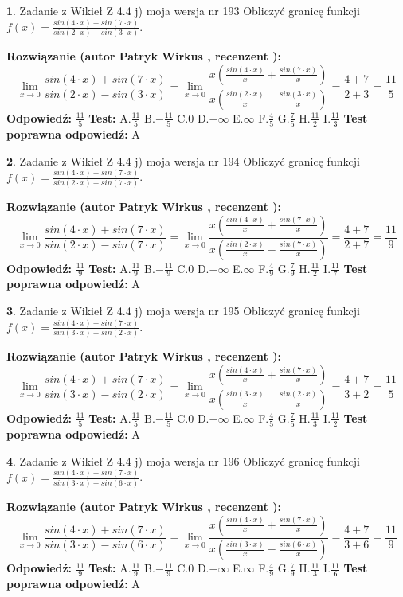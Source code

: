\documentclass[12pt, a4paper]{article}
\theoremstyle{definition} %
\newtheorem{zad}{}
\newcommand{\zadStart}[1]{\begin{zad}#1\newline}
\newcommand{\zadStop}{\end{zad}}
\newcommand{\rozwStart}[2]{\noindent \textbf{Rozwiązanie (autor #1 , recenzent #2): }\newline}
\newcommand{\rozwStop}{\newline}
\newcommand{\odpStart}{\noindent \textbf{Odpowiedź:}\newline}
\newcommand{\odpStop}{\newline}
\newcommand{\testStart}{\noindent \textbf{Test:}\newline}
\newcommand{\testStop}{\newline}
\newcommand{\kluczStart}{\noindent \textbf{Test poprawna odpowiedź:}\newline}
\newcommand{\kluczStop}{\newline}
\begin{document}
\zadStart{Zadanie z Wikieł Z 4.4 j) moja wersja nr 193}
Obliczyć granicę funkcji $f(x)=\frac{sin(4\cdot x) +sin(7\cdot x)}{sin(2\cdot x) -sin(3\cdot x)}$.
\zadStop
\rozwStart{Patryk Wirkus}{}
$$\lim\limits_{x\to 0}\frac{sin(4\cdot x) +sin(7\cdot x)}{sin(2\cdot x) -sin(3\cdot x)}=\lim\limits_{x\to 0}\frac{x(\frac{sin(4\cdot x)}{x}+\frac{sin(7\cdot x)}{x})}{x(\frac{sin(2\cdot x)}{x}-\frac{sin(3\cdot x)}{x})}=\frac{4+7}{2+3} = \frac{11}{5}$$
\rozwStop
\odpStart
$\frac{11}{5}$
\odpStop
\testStart
A.$\frac{11}{5}$
B.$-\frac{11}{5}$
C.$0$
D.$-\infty$
E.$\infty$
F.$\frac{4}{5}$
G.$\frac{7}{5}$
H.$\frac{11}{2}$
I.$\frac{11}{3}$
\testStop
\kluczStart
A
\kluczStop



\zadStart{Zadanie z Wikieł Z 4.4 j) moja wersja nr 194}
Obliczyć granicę funkcji $f(x)=\frac{sin(4\cdot x) +sin(7\cdot x)}{sin(2\cdot x) -sin(7\cdot x)}$.
\zadStop
\rozwStart{Patryk Wirkus}{}
$$\lim\limits_{x\to 0}\frac{sin(4\cdot x) +sin(7\cdot x)}{sin(2\cdot x) -sin(7\cdot x)}=\lim\limits_{x\to 0}\frac{x(\frac{sin(4\cdot x)}{x}+\frac{sin(7\cdot x)}{x})}{x(\frac{sin(2\cdot x)}{x}-\frac{sin(7\cdot x)}{x})}=\frac{4+7}{2+7} = \frac{11}{9}$$
\rozwStop
\odpStart
$\frac{11}{9}$
\odpStop
\testStart
A.$\frac{11}{9}$
B.$-\frac{11}{9}$
C.$0$
D.$-\infty$
E.$\infty$
F.$\frac{4}{9}$
G.$\frac{7}{9}$
H.$\frac{11}{2}$
I.$\frac{11}{7}$
\testStop
\kluczStart
A
\kluczStop



\zadStart{Zadanie z Wikieł Z 4.4 j) moja wersja nr 195}
Obliczyć granicę funkcji $f(x)=\frac{sin(4\cdot x) +sin(7\cdot x)}{sin(3\cdot x) -sin(2\cdot x)}$.
\zadStop
\rozwStart{Patryk Wirkus}{}
$$\lim\limits_{x\to 0}\frac{sin(4\cdot x) +sin(7\cdot x)}{sin(3\cdot x) -sin(2\cdot x)}=\lim\limits_{x\to 0}\frac{x(\frac{sin(4\cdot x)}{x}+\frac{sin(7\cdot x)}{x})}{x(\frac{sin(3\cdot x)}{x}-\frac{sin(2\cdot x)}{x})}=\frac{4+7}{3+2} = \frac{11}{5}$$
\rozwStop
\odpStart
$\frac{11}{5}$
\odpStop
\testStart
A.$\frac{11}{5}$
B.$-\frac{11}{5}$
C.$0$
D.$-\infty$
E.$\infty$
F.$\frac{4}{5}$
G.$\frac{7}{5}$
H.$\frac{11}{3}$
I.$\frac{11}{2}$
\testStop
\kluczStart
A
\kluczStop



\zadStart{Zadanie z Wikieł Z 4.4 j) moja wersja nr 196}
Obliczyć granicę funkcji $f(x)=\frac{sin(4\cdot x) +sin(7\cdot x)}{sin(3\cdot x) -sin(6\cdot x)}$.
\zadStop
\rozwStart{Patryk Wirkus}{}
$$\lim\limits_{x\to 0}\frac{sin(4\cdot x) +sin(7\cdot x)}{sin(3\cdot x) -sin(6\cdot x)}=\lim\limits_{x\to 0}\frac{x(\frac{sin(4\cdot x)}{x}+\frac{sin(7\cdot x)}{x})}{x(\frac{sin(3\cdot x)}{x}-\frac{sin(6\cdot x)}{x})}=\frac{4+7}{3+6} = \frac{11}{9}$$
\rozwStop
\odpStart
$\frac{11}{9}$
\odpStop
\testStart
A.$\frac{11}{9}$
B.$-\frac{11}{9}$
C.$0$
D.$-\infty$
E.$\infty$
F.$\frac{4}{9}$
G.$\frac{7}{9}$
H.$\frac{11}{3}$
I.$\frac{11}{6}$
\testStop
\kluczStart
A
\kluczStop
\end{document}
